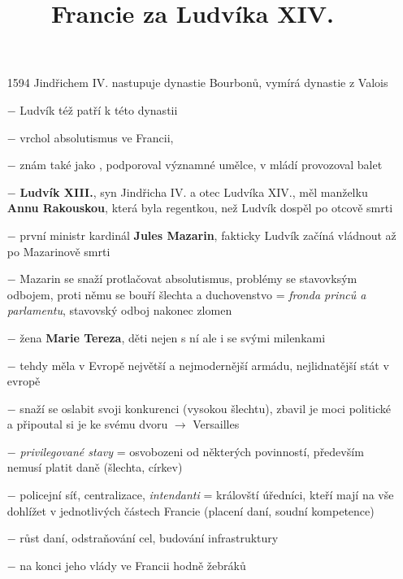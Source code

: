 \documentclass{article}
\title{\vspace{-2cm}Francie za Ludvíka XIV.\vspace{-1.7cm}}
\date{}
\author{}
\begin{document}
\maketitle

\begin{itemize}
    \vspace{-0.5em}
    \setlength\itemsep{0.15em}
    \item[1594] Jindřichem IV. nastupuje dynastie Bourbonů, vymírá dynastie z Valois
    \item[$-$] Ludvík též patří k této dynastii
    \item[$-$] vrchol absolutismus ve Francii, 
    \item[$-$] znám také jako , podporoval významné umělce, v mládí provozoval balet
    \item[$-$] \textbf{Ludvík XIII.}, syn Jindřicha IV. a otec Ludvíka XIV., měl manželku \textbf{Annu Rakouskou}, která byla regentkou, než Ludvík dospěl po otcově smrti
    \item[$-$] první ministr kardinál \textbf{Jules Mazarin}, fakticky Ludvík začíná vládnout až po Mazarinově smrti
    \item[$-$] Mazarin se snaží protlačovat absolutismus, problémy se stavovksým odbojem, proti němu se bouří šlechta a duchovenstvo = \textit{fronda princů a parlamentu}, stavovský odboj nakonec zlomen
    \item[$-$] žena \textbf{Marie Tereza}, děti nejen s ní ale i se svými milenkami
    \item[$-$] tehdy měla v Evropě největší a nejmodernější armádu, nejlidnatější stát v evropě
    \item[$-$] snaží se oslabit svoji konkurenci (vysokou šlechtu), zbavil je moci politické a připoutal si je ke svému dvoru $\rightarrow$ Versailles
    \item[$-$] \textit{privilegované stavy} = osvobozeni od některých povinností, především nemusí platit daně (šlechta, církev)
    \item[$-$] policejní síť, centralizace, \textit{intendanti} = královští úředníci, kteří mají na vše dohlížet v jednotlivých částech Francie (placení daní, soudní kompetence)
    \item[$-$] růst daní, odstraňování cel, budování infrastruktury
    \item[$-$] na konci jeho vlády ve Francii hodně žebráků
\end{itemize}
\end{document}
